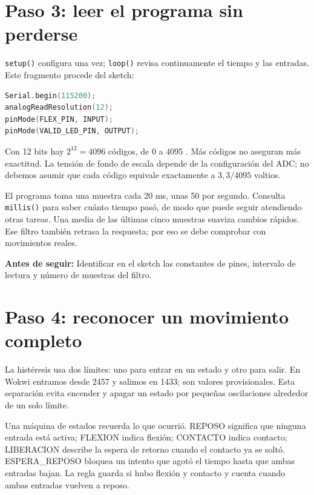 \documentclass[11pt,a4paper]{article}
\newcommand{\comprobar}[1]{\par\smallskip\noindent\colorbox{suave}{\parbox{\dimexpr\linewidth-2\fboxsep}{\textbf{Antes de seguir:} #1}}\par\smallskip}
\begin{document}
\section{Paso 3: leer el programa sin perderse}
\texttt{setup()} configura una vez; \texttt{loop()} revisa continuamente el tiempo y las entradas. Este fragmento procede del sketch:
\begin{lstlisting}[language=C++]
Serial.begin(115200);
analogReadResolution(12);
pinMode(FLEX_PIN, INPUT);
pinMode(VALID_LED_PIN, OUTPUT);
\end{lstlisting}
Con 12 bits hay $2^{12}=4096$ códigos, de 0 a 4095 \cite{adc}. Más códigos no aseguran más exactitud. La tensión de fondo de escala depende de la configuración del ADC; no debemos asumir que cada código equivale exactamente a $3{,}3/4095$ voltios.

El programa toma una muestra cada 20 ms, unas 50 por segundo. Consulta \texttt{millis()} para saber cuánto tiempo pasó, de modo que puede seguir atendiendo otras tareas. Una media de las últimas cinco muestras suaviza cambios rápidos. Ese filtro también retrasa la respuesta; por eso se debe comprobar con movimientos reales.
\comprobar{Identificar en el sketch las constantes de pines, intervalo de lectura y número de muestras del filtro.}

\section{Paso 4: reconocer un movimiento completo}
La histéresis usa dos límites: uno para entrar en un estado y otro para salir. En Wokwi entramos desde 2457 y salimos en 1433; son valores provisionales. Esta separación evita encender y apagar un estado por pequeñas oscilaciones alrededor de un solo límite.

Una máquina de estados recuerda lo que ocurrió. REPOSO significa que ninguna entrada está activa; FLEXION indica flexión; CONTACTO indica contacto; LIBERACION describe la espera de retorno cuando el contacto ya se soltó. ESPERA\_REPOSO bloquea un intento que agotó el tiempo hasta que ambas entradas bajan. La regla guarda si hubo flexión y contacto y cuenta cuando ambas entradas vuelven a reposo.
\end{document}
